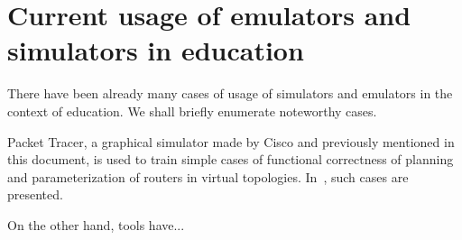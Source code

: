 \section{Current usage of emulators and simulators in education}
\label{sec:leavingcurrentusage}

There have been already many cases of usage of simulators and emulators in the context of education.
We shall briefly enumerate noteworthy cases.

Packet Tracer, a graphical simulator made by Cisco and previously mentioned in this document, is used to train simple cases of functional correctness of planning and parameterization of routers in virtual topologies.
In~\cite{rolepackettracer,evaluatesimpackettracer,teachinginovation}, such cases are presented.

On the other hand, tools have... %

